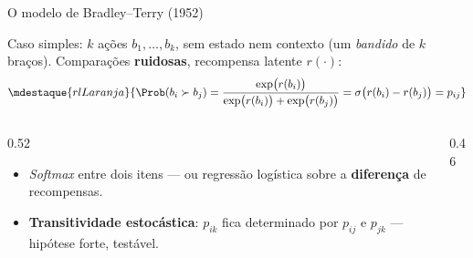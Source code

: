 \documentclass[aspectratio=169, 11pt]{beamer}
\newcommand{\sig}{\sigma}
\begin{document}
\begin{frame}{O modelo de Bradley--Terry (1952)}

  Caso simples: $k$ ações $b_1,\dots,b_k$, sem estado nem contexto (um
  \emph{bandido} de $k$ braços). Comparações \textbf{ruidosas}, recompensa
  latente $r(\cdot)$:
  \[
    \mdestaque{rlLaranja}{\Prob(b_i \succ b_j)
      = \frac{\exp\bigl(r(b_i)\bigr)}{\exp\bigl(r(b_i)\bigr) + \exp\bigl(r(b_j)\bigr)}
      = \sig\bigl(r(b_i) - r(b_j)\bigr) = p_{ij}}
  \]

  \begin{columns}[T]
  \begin{column}{0.52\textwidth}
    \begin{itemize}\setlength{\itemsep}{0.2ex}
      \item \emph{Softmax} entre dois itens --- ou regressão logística sobre a
        \textbf{diferença} de recompensas.
      \item \textbf{Transitividade estocástica}: $p_{ik}$ fica determinado por
        $p_{ij}$ e $p_{jk}$ --- hipótese forte, testável.
    \end{itemize}
  \end{column}
  \begin{column}{0.46\textwidth}
    \begin{center}
    \end{center}
  \end{column}
  \end{columns}
\end{frame}
\end{document}
